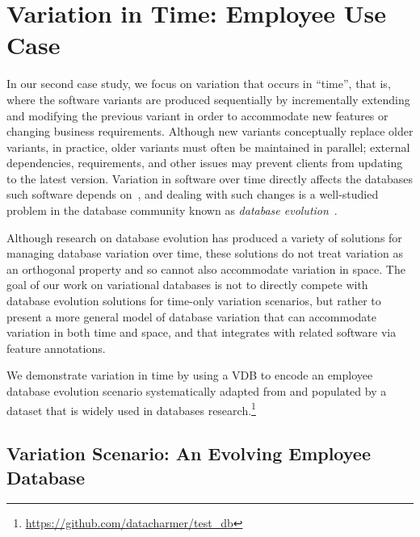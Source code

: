 \section{Variation in Time: Employee Use Case}
\label{sec:emp-vdb}



In our second case study, we focus on variation that occurs in ``time'', that
is, where the software variants are produced sequentially by incrementally
extending and modifying the previous variant in order to accommodate new
features or changing business requirements. Although new variants conceptually
replace older variants, in practice, older variants must often be maintained in
parallel; external dependencies, requirements, and other issues may prevent
clients from updating to the latest version.
%
Variation in software over time directly affects the databases such software
depends on~\cite{dbDecay16Stonebraker}, and dealing with such changes is a
well-studied problem in the database community known as \emph{database
evolution}~\cite{schVersioningSurvey95Roddick}.


Although research on database evolution has produced a variety of solutions for
managing database variation over time, these solutions do not treat variation
as an orthogonal property and so cannot also accommodate variation in space.
The goal of our work on variational databases is not to directly compete with
database evolution solutions for time-only variation scenarios, but rather to
present a more general model of database variation that can accommodate
variation in both time and space, and that integrates with related software via
feature annotations.

We demonstrate variation in time by 
using a VDB to encode an employee database evolution scenario
systematically adapted from
\citet{prima08Moon} and populated by a dataset that is widely used
in databases research.\footnote{\url{https://github.com/datacharmer/test_db}}


\subsection{Variation Scenario: An Evolving Employee Database}
\label{sec:emp-scenario}



